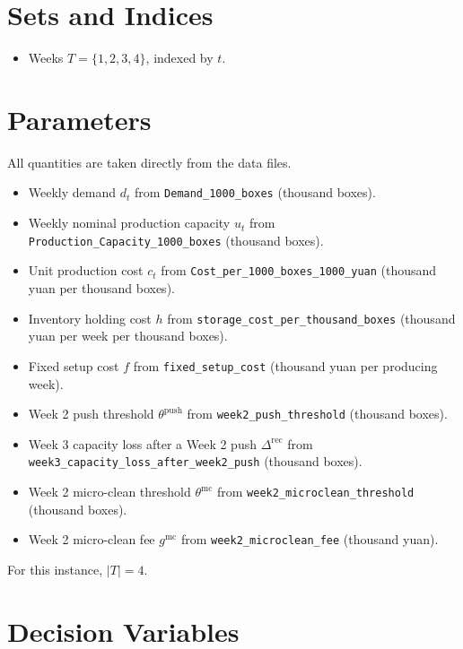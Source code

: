 \section*{Sets and Indices}

\begin{itemize}
    \item Weeks $T=\{1,2,3,4\}$, indexed by $t$.
\end{itemize}

\section*{Parameters}

All quantities are taken directly from the data files.

\begin{itemize}
    \item Weekly demand $d_t$ from \texttt{Demand\_1000\_boxes} (thousand boxes).
    \item Weekly nominal production capacity $u_t$ from \texttt{Production\_Capacity\_1000\_boxes} (thousand boxes).
    \item Unit production cost $c_t$ from \texttt{Cost\_per\_1000\_boxes\_1000\_yuan} (thousand yuan per thousand boxes).
    \item Inventory holding cost $h$ from \texttt{storage\_cost\_per\_thousand\_boxes} (thousand yuan per week per thousand boxes).
    \item Fixed setup cost $f$ from \texttt{fixed\_setup\_cost} (thousand yuan per producing week).
    \item Week 2 push threshold $\theta^{\mathrm{push}}$ from \texttt{week2\_push\_threshold} (thousand boxes).
    \item Week 3 capacity loss after a Week 2 push $\Delta^{\mathrm{rec}}$ from \texttt{week3\_capacity\_loss\_after\_week2\_push} (thousand boxes).
    \item Week 2 micro-clean threshold $\theta^{\mathrm{mc}}$ from \texttt{week2\_microclean\_threshold} (thousand boxes).
    \item Week 2 micro-clean fee $g^{\mathrm{mc}}$ from \texttt{week2\_microclean\_fee} (thousand yuan).
\end{itemize}

For this instance, $|T|=4$.

\section*{Decision Variables}

